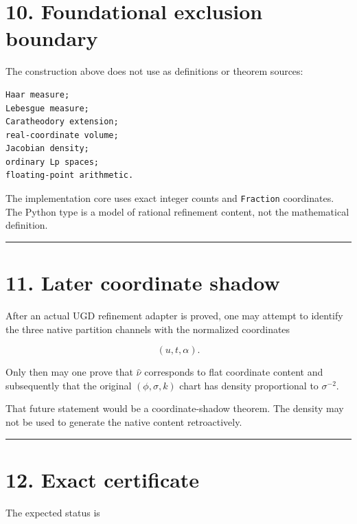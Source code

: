 \hypertarget{foundational-exclusion-boundary}{%
\section{10. Foundational exclusion boundary}\label{foundational-exclusion-boundary}}

The construction above does not use as definitions or theorem sources:

\begin{verbatim}
Haar measure;
Lebesgue measure;
Caratheodory extension;
real-coordinate volume;
Jacobian density;
ordinary Lp spaces;
floating-point arithmetic.
\end{verbatim}

The implementation core uses exact integer counts and \texttt{Fraction} coordinates.
The Python type is a model of rational refinement content, not the mathematical
definition.

\begin{center}\rule{0.5\linewidth}{0.5pt}\end{center}

\hypertarget{later-coordinate-shadow}{%
\section{11. Later coordinate shadow}\label{later-coordinate-shadow}}

After an actual UGD refinement adapter is proved, one may attempt to identify the
three native partition channels with the normalized coordinates

\[
(u,t,\alpha).
\]

Only then may one prove that \(\widehat\nu\) corresponds to flat coordinate
content and subsequently that the original \((\phi,\sigma,k)\) chart has density
proportional to \(\sigma^{-2}\).

That future statement would be a coordinate-shadow theorem. The density may not
be used to generate the native content retroactively.

\begin{center}\rule{0.5\linewidth}{0.5pt}\end{center}

\hypertarget{exact-certificate}{%
\section{12. Exact certificate}\label{exact-certificate}}

The expected status is

